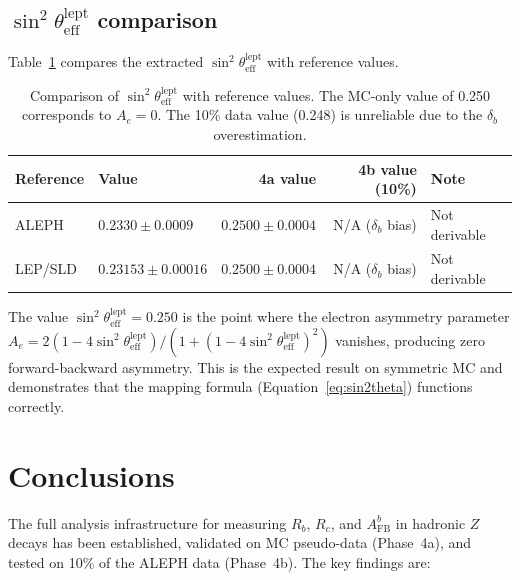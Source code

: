 \documentclass[11pt,a4paper]{article}
\begin{document}
\subsection{$\sin^2\theta_\mathrm{eff}^\mathrm{lept}$ comparison}
\label{sec:sin2theta_comparison}

Table~\ref{tab:sin2theta_comparison} compares the extracted $\sin^2\theta_\mathrm{eff}^\mathrm{lept}$
with reference values.

\begin{table}[htbp]
\centering
\caption{Comparison of $\sin^2\theta_\mathrm{eff}^\mathrm{lept}$ with reference values.
The MC-only value of 0.250 corresponds to $A_e = 0$. The 10\% data value (0.248) is
unreliable due to the $\delta_b$ overestimation.}
\label{tab:sin2theta_comparison}
\begin{tabular}{llrrl}
\toprule
Reference & Value & 4a value & 4b value (10\%) & Note \\
\midrule
ALEPH~\cite{ALEPH:AFBb} & $0.2330 \pm 0.0009$ & $0.2500 \pm 0.0004$ & N/A ($\delta_b$ bias) & Not derivable \\
LEP/SLD~\cite{LEP:EWWG:2005} & $0.23153 \pm 0.00016$ & $0.2500 \pm 0.0004$ & N/A ($\delta_b$ bias) & Not derivable \\
\bottomrule
\end{tabular}
\end{table}

The value $\sin^2\theta_\mathrm{eff}^\mathrm{lept} = 0.250$ is the point where
the electron asymmetry parameter $A_e = 2(1 - 4\sin^2\theta_\mathrm{eff}^\mathrm{lept})/
(1 + (1 - 4\sin^2\theta_\mathrm{eff}^\mathrm{lept})^2)$ vanishes, producing zero
forward-backward asymmetry. This is the expected result on symmetric MC and demonstrates
that the mapping formula (Equation~\ref{eq:sin2theta}) functions correctly.

\FloatBarrier
{}
\section{Conclusions}
\label{sec:conclusions}

The full analysis infrastructure for measuring $R_b$, $R_c$, and $A_\mathrm{FB}^b$ in
hadronic $Z$ decays has been established, validated on MC pseudo-data (Phase~4a), and
tested on 10\% of the ALEPH data (Phase~4b). The key findings are:
\end{document}
